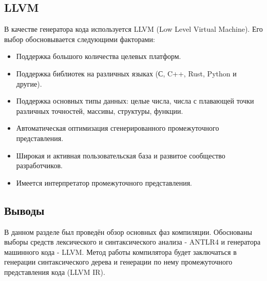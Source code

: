 \subsection{LLVM}
В качестве генератора кода используется LLVM (Low Level Virtual Machine). Его выбор обосновывается следующими факторами:

\begin{itemize}
    \item Поддержка большого количества целевых платформ.
    \item Поддержка библиотек на различных языках (С, C++, Rust, Python и другие).
    \item Поддержка основных типы данных: целые числа, числа с плавающей точки различных точностей, массивы, структуры, функции.
    \item Автоматическая оптимизация сгенерированного промежуточного представления.
    \item Широкая и активная пользовательская база и развитое сообщество разработчиков.
    \item Имеется интерпретатор промежуточного представления.
\end{itemize}

\subsection*{Выводы}
В данном разделе был проведён обзор основных фаз компиляции. Обоснованы выборы средств лексического и синтаксического анализа - ANTLR4 и генератора машинного кода - LLVM. Метод работы компилятора будет заключаться в генерации синтаксического дерева и генерации по нему промежуточного представления кода (LLVM IR).

\pagebreak
